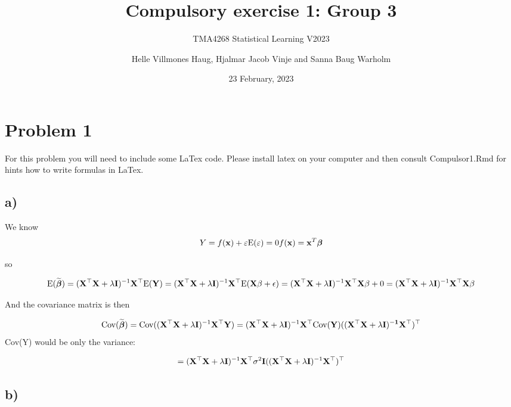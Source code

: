 \documentclass[
]{article}
\title{Compulsory exercise 1: Group 3}
\subtitle{TMA4268 Statistical Learning V2023}
\author{Helle Villmones Haug, Hjalmar Jacob Vinje and Sanna Baug
Warholm}
\date{23 February, 2023}
\begin{document}
\maketitle

\hypertarget{problem-1}{%
\section{Problem 1}\label{problem-1}}

For this problem you will need to include some LaTex code. Please
install latex on your computer and then consult Compulsor1.Rmd for hints
how to write formulas in LaTex.

\hypertarget{a}{%
\subsection{a)}\label{a}}

We know \[
Y=f(\mathbf {x})+\varepsilon \\
\text{E}(\varepsilon)=0 \\
f(\mathbf{x}) = \mathbf{x}^T\boldsymbol{\beta}
\]

so

\[\text{E}(\widetilde{\boldsymbol \beta}) =(\mathbf{X}^\top\mathbf{X}+\lambda {\bf I})^{-1}\mathbf{X}^\top\text{E}({\bf Y}) = \\
(\mathbf{X}^\top\mathbf{X}+\lambda {\bf I})^{-1}\mathbf{X}^\top\text{E}(\mathbf{X}\beta+\epsilon) = \\
(\mathbf{X}^\top\mathbf{X}+\lambda {\bf I})^{-1}\mathbf{X}^\top\mathbf{X}\beta+0 = \\
(\mathbf{X}^\top\mathbf{X}+\lambda {\bf I})^{-1}\mathbf{X}^\top\mathbf{X}\beta \]

And the covariance matrix is then

\[\text{Cov}(\widetilde{\boldsymbol \beta}) = \text{Cov}((\mathbf{X}^\top\mathbf{X}+\lambda {\bf I})^{-1}\mathbf{X}^\top{\bf Y}) = \\
(\mathbf{X}^\top\mathbf{X}+\lambda {\bf I})^{-1}\mathbf{X}^\top \text{Cov}(\bf{Y}) ((\mathbf{X}^\top\mathbf{X}+\lambda {\bf I})^{-1}\mathbf{X}^\top)^\top
\] Cov(Y) would be only the variance:

\[
 = (\mathbf{X}^\top\mathbf{X}+\lambda {\bf I})^{-1}\mathbf{X}^\top \sigma^{2} \mathbf{I}  ((\mathbf{X}^\top\mathbf{X}+\lambda {\bf I})^{-1}\mathbf{X}^\top)^\top
\]

\hypertarget{b}{%
\subsection{b)}\label{b}}
\end{document}
